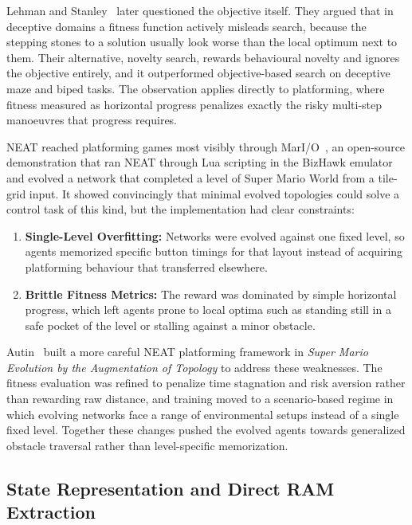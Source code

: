 \noindent
Lehman and Stanley~\cite{lehman2011} later questioned the objective itself. They argued
that in deceptive domains a fitness function actively misleads search, because
the stepping stones to a solution usually look worse than the local optimum
next to them. Their alternative, novelty search, rewards behavioural novelty
and ignores the objective entirely, and it outperformed objective-based search
on deceptive maze and biped tasks. The observation applies directly to
platforming, where fitness measured as horizontal progress penalizes exactly the
risky multi-step manoeuvres that progress requires.

\noindent
NEAT reached platforming games most visibly through MarI/O~\cite{sethbling2015},
an open-source demonstration that ran NEAT through Lua scripting in the BizHawk
emulator and evolved a network that completed a level of Super Mario World from
a tile-grid input. It showed convincingly that minimal evolved topologies could
solve a control task of this kind, but the implementation had clear
constraints:

\begin{enumerate}
    \item \textbf{Single-Level Overfitting:} Networks were evolved against one
    fixed level, so agents memorized specific button timings for that layout
    instead of acquiring platforming behaviour that transferred elsewhere.

    \item \textbf{Brittle Fitness Metrics:} The reward was dominated by simple
    horizontal progress, which left agents prone to local optima such as
    standing still in a safe pocket of the level or stalling against a minor
    obstacle.
\end{enumerate}

\noindent
Autin~\cite{autin2024} built a more careful NEAT platforming framework in \emph{Super
Mario Evolution by the Augmentation of Topology} to address these weaknesses.
The fitness evaluation was refined to penalize time stagnation and risk
aversion rather than rewarding raw distance, and training moved to a
scenario-based regime in which evolving networks face a range of environmental
setups instead of a single fixed level. Together these changes pushed the
evolved agents towards generalized obstacle traversal rather than
level-specific memorization.

\subsection{State Representation and Direct RAM Extraction}
\label{subsec:lit-4}

